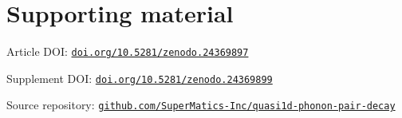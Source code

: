 \documentclass[11pt]{article}
\newcommand{\LINEARTHREEDOI}{https://doi.org/10.5281/zenodo.24369897}
\newcommand{\LINEARTHREESUPPDOI}{https://doi.org/10.5281/zenodo.24369899}
\newcommand{\LINEARTHREEREPO}{https://github.com/SuperMatics-Inc/quasi1d-phonon-pair-decay}
\begin{document}
\section*{Supporting material}
\noindent Article DOI: \href{\LINEARTHREEDOI}{\nolinkurl{doi.org/10.5281/zenodo.24369897}}
\par\noindent Supplement DOI: \href{\LINEARTHREESUPPDOI}{\nolinkurl{doi.org/10.5281/zenodo.24369899}}
\par\noindent Source repository: \href{\LINEARTHREEREPO}{\nolinkurl{github.com/SuperMatics-Inc/quasi1d-phonon-pair-decay}}

{\raggedright\par}
\end{document}
